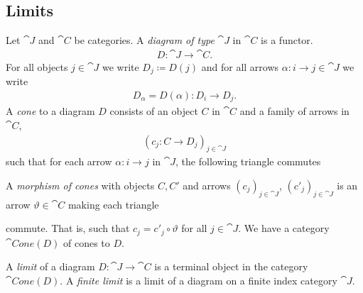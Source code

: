 \documentclass{article}
\begin{document}
\subsection{Limits}

\begin{definition}
    Let $\cat J$ and $\cat C$ be categories. A \emph{diagram of type} $\cat J$
    in $\cat C$ is a functor.
    \begin{align*}
        D:\cat J \to \cat C.
    \end{align*}
    For all objects $j\in\cat J$ we write $D_j\coloneqq D(j)$ and for all arrows
    $\alpha:i\to j\in\cat J$ we write
    \begin{align*}
        D_\alpha = D(\alpha):D_i\to D_j.
    \end{align*}
    A \emph{cone} to a diagram $D$ consists of an object $C$ in $\cat C$ and
    a family of arrows in $\cat C$,
    \begin{align*}
        \left(c_j:C\to D_j\right)_{j\in\cat J}
    \end{align*}
    such that for each arrow $\alpha:i\to j$ in $\cat J$,
    the following triangle commutes
    \begin{center}
    \end{center}
    A \emph{morphism of cones} with objects $C,C'$ and arrows
    $\left(c_j\right)_{j\in\cat J}$, $\left(c'_j\right)_{j\in\cat J}$
    is an arrow $\vartheta\in\cat C$ making each triangle
    \begin{center}
    \end{center}
    commute. That is, such that $c_j = c'_j \circ \vartheta$ for all $j\in\cat J$.
    We have a category $\cat{Cone}(D)$ of cones to $D$.
\end{definition}

\begin{definition}[Awodey p. 102]
    A \emph{limit} of a diagram $D:\cat J \to \cat C$ is a terminal object in the
    category $\cat{Cone}(D)$. A \emph{finite limit} is a limit of a diagram on
    a finite index category $\cat J$.
\end{definition}
\end{document}
